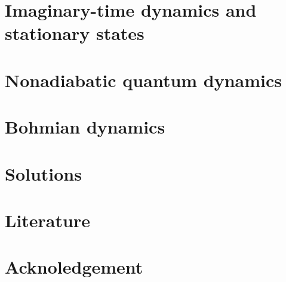 \documentclass[paper=b5,parskip=half,open=any,headsepline=true,11pt]{scrbook}
\begin{document}
\chapter{Imaginary-time dynamics and stationary states}
\label{kap:imqd}
% 

\chapter{Nonadiabatic quantum dynamics}
\label{kap:nonad}
% 

\chapter{Bohmian dynamics}
\label{kap:bohm}
% 


\chapter*{Solutions}
\label{kap:sol}





\chapter*{Literature}
\label{kap:literatura}


% 

\chapter*{Acknoledgement}
\label{kap:podekovani}


\printnoidxglossary[type=\acronymtype,title=List of acronyms,toctitle=List of acronyms]


\renewcommand*{\lstlistlistingname}{List of codes}
\lstlistoflistings
{}

\backmatter
\printindex
\end{document}
